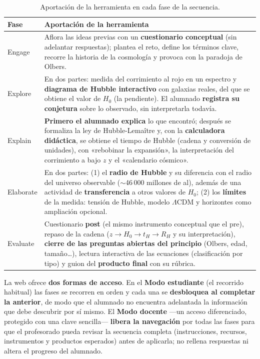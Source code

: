 \begin{table}[ht]
\centering
\caption{Aportación de la herramienta en cada fase de la secuencia.}\label{tab:appfases}
\begin{tabularx}{\textwidth}{|>{\raggedright\arraybackslash}p{2.4cm}|>{\raggedright\arraybackslash}X|}
\hline
\rowcolor{naranja}
{\color{white}\textbf{Fase}} & {\color{white}\textbf{Aportación de la herramienta}} \\ \hline
Engage & Aflora las ideas previas con un \textbf{cuestionario conceptual} (sin adelantar respuestas); plantea el reto, define los términos clave, recorre la historia de la cosmología y provoca con la paradoja de Olbers. \\ \hline
Explore & En dos partes: medida del corrimiento al rojo en un espectro y \textbf{diagrama de Hubble interactivo} con galaxias reales, del que se obtiene el valor de $H_{0}$ (la pendiente). El alumnado \textbf{registra su conjetura} sobre lo observado, sin interpretarla todavía. \\ \hline
Explain & \textbf{Primero el alumnado explica} lo que encontró; después se formaliza la ley de Hubble-Lemaître y, con la \textbf{calculadora didáctica}, se obtiene el tiempo de Hubble (cadena y conversión de unidades), con «rebobinar la expansión», la interpretación del corrimiento a bajo $z$ y el «calendario cósmico». \\ \hline
Elaborate & En dos partes: (1) el \textbf{radio de Hubble} y su diferencia con el radio del universo observable ($\sim$46\,000 millones de al), además de una actividad de \textbf{transferencia} a otros valores de $H_{0}$; (2) los \textbf{límites} de la medida: tensión de Hubble, modelo $\Lambda$CDM y horizontes como ampliación opcional. \\ \hline
Evaluate & Cuestionario \textbf{post} (el mismo instrumento conceptual que el pre), repaso de la cadena ($z \rightarrow H_{0} \rightarrow t_H \rightarrow R_H$ y su interpretación), \textbf{cierre de las preguntas abiertas del principio} (Olbers, edad, tamaño\ldots), lectura interactiva de las ecuaciones (clasificación por tipo) y guion del \textbf{producto final} con su rúbrica. \\ \hline
\end{tabularx}
\end{table}

La web ofrece \textbf{dos formas de acceso}. En el \textbf{Modo estudiante} (el recorrido habitual) las fases se recorren en orden y cada una se \textbf{desbloquea al completar la anterior}, de modo que el alumnado no encuentra adelantada la información que debe descubrir por sí mismo. El \textbf{Modo docente} ---un acceso diferenciado, protegido con una clave sencilla--- \textbf{libera la navegación} por todas las fases para que el profesorado pueda revisar la secuencia completa (instrucciones, recursos, instrumentos y productos esperados) antes de aplicarla; no rellena respuestas ni altera el progreso del alumnado.

